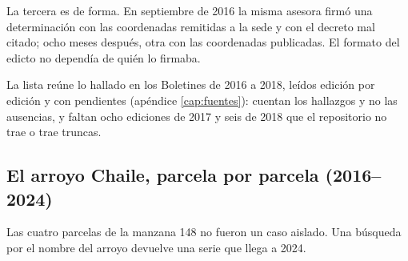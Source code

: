 \begin{cautela}
La tercera es de forma. En septiembre de 2016 la misma asesora firmó una determinación con las coordenadas remitidas a la sede y con el decreto mal citado; ocho meses después, otra con las coordenadas publicadas. El formato del edicto no dependía de quién lo firmaba.

La lista reúne lo hallado en los Boletines de 2016 a 2018, leídos edición por edición y con pendientes (apéndice \ref{cap:fuentes}): cuentan los hallazgos y no las ausencias, y faltan ocho ediciones de 2017 y seis de 2018 que el repositorio no trae o trae truncas. 
\end{cautela}

\subsection*{El arroyo Chaile, parcela por parcela (2016--2024)}

Las cuatro parcelas de la manzana 148 no fueron un caso aislado. Una búsqueda por el nombre del arroyo devuelve una serie que llega a 2024.

